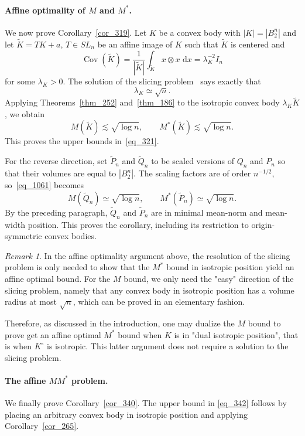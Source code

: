\documentclass[12pt]{article}
\theoremstyle{definition}
\theoremstyle{remark}
\newtheorem{remark}[theorem]{Remark}
\newcommand{\Cov}{\operatorname{Cov}}
\newcommand{\dd}{\,\mathrm d}
\begin{document}
\paragraph{Affine optimality of $M$ and $M^*$.}
We now prove Corollary~\ref{cor_319}. Let $K$ be a convex body
with $|K|=|B_2^n|$ and let $\widetilde K = TK + a$, $T\in SL_n$ be an affine image of $K$ such that $\widetilde K$ is centered and
$$\Cov(\widetilde K) = \frac{1}{|\widetilde K|}\int_{\widetilde K}x\otimes x \,\dd x = \lambda_K^{-2} I_n$$
for some $\lambda_K>0$. The solution of the slicing
problem~\cite{KlartagLehecSlicing, BizeulSlicing, BrazitikosSlicing} says exactly that 
$$\lambda_K \simeq \sqrt{n}.$$
Applying Theorems~\ref{thm_252} and~\ref{thm_186} to the isotropic convex body $\lambda_K \widetilde K$ , we obtain
\[
  M(\widetilde K)\lesssim\sqrt{\log n},
  \qquad
  M^*(\widetilde K)\lesssim\sqrt{\log n}.
\]
This proves the upper bounds in~\eqref{eq_321}.

For the reverse direction, set $\widetilde P_n$ and $\widetilde Q_n$ to be scaled versions of $Q_n$ and $P_n$ so that their volumes
are equal to $|B_2^n|$. The scaling factors are of order $n^{-1/2}$, so~\eqref{eq_1061} becomes
\[
  M(\widetilde Q_n)\simeq\sqrt{\log n},
  \qquad
  M^*(\widetilde P_n)\simeq\sqrt{\log n}.
\]
By the preceding paragraph, $\widetilde Q_n$ and $\widetilde P_n$ are in minimal mean-norm and mean-width position. This proves the corollary, including
its restriction to origin-symmetric convex bodies.

\begin{remark}
    In the affine optimality argument above, the resolution of the slicing problem is only needed to show that the $M^*$ bound in isotropic position yield an affine optimal bound. For the $M$ bound, we only need the "easy" direction of the slicing problem, namely that any convex body in isotropic position has a volume radius at most $\sqrt{n}$, which can be proved in an elementary fashion. 

    Therefore, as discussed in the introduction, one may dualize the $M$ bound to prove get an affine optimal $M^*$ bound when $K$ is in "dual isotropic position", that is when $K^\circ$ is isotropic. This latter argument does not require a solution to the slicing problem.
\end{remark}

\paragraph{The affine $MM^*$ problem.}
We finally prove Corollary~\ref{cor_340}. The upper bound in
\eqref{eq_342} follows by placing an arbitrary convex body in
isotropic position and applying Corollary~\ref{cor_265}.
\end{document}
